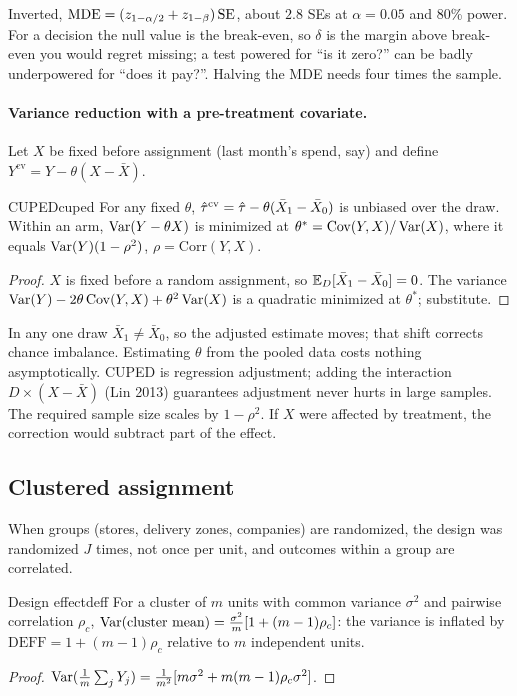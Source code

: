 \documentclass[11pt]{article}
\begin{document}
Inverted, $\text{MDE} = (z_{1-\alpha/2} + z_{1-\beta})\operatorname{SE}$, about $2.8$ SEs at $\alpha = 0.05$ and 80\% power.
For a decision the null value is the break-even, so $\delta$ is the margin above break-even you would regret
missing; a test powered for ``is it zero?'' can be badly underpowered for ``does it pay?''. Halving the MDE
needs four times the sample.

\paragraph{Variance reduction with a pre-treatment covariate.} Let $X$ be fixed before assignment (last
month's spend, say) and define $Y^{\text{cv}} = Y - \theta(X - \bar X)$.

\begin{prop}{CUPED}{cuped}
For any fixed $\theta$, $\hat{\tau}^{\text{cv}} = \hat{\tau} - \theta(\bar X_1 - \bar X_0)$ is unbiased over the draw.
Within an arm, $\operatorname{Var}(Y - \theta X)$ is minimized at $\theta^\ast = \operatorname{Cov}(Y,X)/\operatorname{Var}(X)$, where it equals
$\operatorname{Var}(Y)(1-\rho^2)$, $\rho = \mathrm{Corr}(Y, X)$.
\end{prop}
\begin{proof}
$X$ is fixed before a random assignment, so $\mathbb{E}_D[\bar X_1 - \bar X_0] = 0$. The variance
$\operatorname{Var}(Y) - 2\theta\operatorname{Cov}(Y,X) + \theta^2\operatorname{Var}(X)$ is a quadratic minimized at $\theta^\ast$; substitute.
\end{proof}

In any one draw $\bar X_1 \ne \bar X_0$, so the adjusted estimate moves; that shift corrects chance imbalance.
Estimating $\theta$ from the pooled data costs nothing asymptotically. CUPED is regression adjustment; adding
the interaction $D \times (X - \bar X)$ (Lin 2013) guarantees adjustment never hurts in large samples.
The required sample size scales by $1 - \rho^2$. If $X$ were affected by treatment, the correction would
subtract part of the effect.

\subsection{Clustered assignment}

When groups (stores, delivery zones, companies) are randomized, the design was randomized $J$ times, not once
per unit, and outcomes within a group are correlated.

\begin{prop}{Design effect}{deff}
For a cluster of $m$ units with common variance $\sigma^2$ and pairwise correlation $\rho_c$,
$\operatorname{Var}(\text{cluster mean}) = \tfrac{\sigma^2}{m}[1 + (m-1)\rho_c]$: the variance is inflated by
$\text{DEFF} = 1 + (m-1)\rho_c$ relative to $m$ independent units.
\end{prop}
\begin{proof}
$\operatorname{Var}(\tfrac1m\sum_j Y_j) = \tfrac{1}{m^2}[m\sigma^2 + m(m-1)\rho_c\sigma^2]$.
\end{proof}
\end{document}
